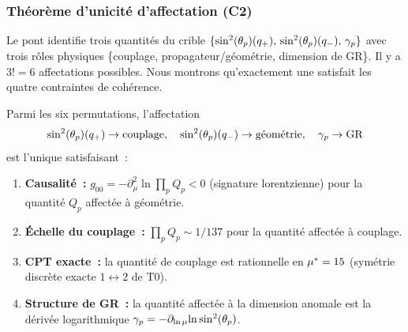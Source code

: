 \documentclass[12pt,a4paper]{article}
\begin{document}
\subsubsection{Théorème d'unicité d'affectation (C2)}
\label{sec:ch9_C2}

Le pont identifie trois quantités du crible
$\{\sin^2(\theta_{p})(q_{+}),\,\sin^2(\theta_{p})(q_{-}),\,\gamma_{p}\}$ avec trois
rôles physiques \{couplage, propagateur/géométrie, dimension de
GR\}. Il y a $3! = 6$ affectations possibles. Nous montrons
qu'exactement une satisfait les quatre contraintes de cohérence.

\begin{theoreme}
\label{thm:C2_bridge}
Parmi les six permutations, l'affectation
\begin{equation}
  \sin^2(\theta_{p})(q_{+}) \to \text{couplage},\quad
  \sin^2(\theta_{p})(q_{-}) \to \text{géométrie},\quad
  \gamma_{p} \to \text{GR}
  \label{eq:unique_assignment}
\end{equation}
est l'unique satisfaisant~:
\begin{enumerate}[nosep,label=(C\arabic*)]
\item\label{C:causality}
  \textbf{Causalité~:}
  $g_{00} = -\partial^2_\mu\!\ln\!\prod_p Q_p < 0$
  (signature lorentzienne) pour la quantité $Q_p$ affectée à
  géométrie.
\item\label{C:coupling}
  \textbf{Échelle du couplage~:}
  $\prod_p Q_p \sim 1/137$ pour la quantité affectée à couplage.
\item\label{C:CPT}
  \textbf{CPT exacte~:}
  la quantité de couplage est rationnelle en ${\mu^{*}} = 15$
  (symétrie discrète exacte $1\leftrightarrow 2$ de T0).
\item\label{C:RG}
  \textbf{Structure de GR~:}
  la quantité affectée à la dimension anomale est la dérivée
  logarithmique
  $\gamma_{p} = -\partial_{\ln\mu}\!\ln\sin^2(\theta_{p})$.
\end{enumerate}
\end{theoreme}
\end{document}
